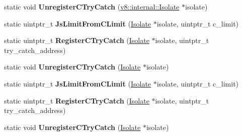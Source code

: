 \begin{DoxyCompactItemize}
\item 
static void {\bfseries Unregister\+C\+Try\+Catch} (\hyperlink{classv8_1_1internal_1_1_isolate}{v8\+::internal\+::\+Isolate} $\ast$isolate)\hypertarget{classv8_1_1internal_1_1_simulator_stack_aba310aee87eed385313d42cbc30dcd8a}{}\label{classv8_1_1internal_1_1_simulator_stack_aba310aee87eed385313d42cbc30dcd8a}

\item 
static uintptr\+\_\+t {\bfseries Js\+Limit\+From\+C\+Limit} (\hyperlink{classv8_1_1internal_1_1_isolate}{Isolate} $\ast$isolate, uintptr\+\_\+t c\+\_\+limit)\hypertarget{classv8_1_1internal_1_1_simulator_stack_a093b55e95fcd0c97eb2c1c262b893a08}{}\label{classv8_1_1internal_1_1_simulator_stack_a093b55e95fcd0c97eb2c1c262b893a08}

\item 
static uintptr\+\_\+t {\bfseries Register\+C\+Try\+Catch} (\hyperlink{classv8_1_1internal_1_1_isolate}{Isolate} $\ast$isolate, uintptr\+\_\+t try\+\_\+catch\+\_\+address)\hypertarget{classv8_1_1internal_1_1_simulator_stack_aa65ef6412ce0b3fd2c27fa870162524b}{}\label{classv8_1_1internal_1_1_simulator_stack_aa65ef6412ce0b3fd2c27fa870162524b}

\item 
static void {\bfseries Unregister\+C\+Try\+Catch} (\hyperlink{classv8_1_1internal_1_1_isolate}{Isolate} $\ast$isolate)\hypertarget{classv8_1_1internal_1_1_simulator_stack_a88b1641de138b2d8eb764f9d71f601c8}{}\label{classv8_1_1internal_1_1_simulator_stack_a88b1641de138b2d8eb764f9d71f601c8}

\item 
static uintptr\+\_\+t {\bfseries Js\+Limit\+From\+C\+Limit} (\hyperlink{classv8_1_1internal_1_1_isolate}{Isolate} $\ast$isolate, uintptr\+\_\+t c\+\_\+limit)\hypertarget{classv8_1_1internal_1_1_simulator_stack_a093b55e95fcd0c97eb2c1c262b893a08}{}\label{classv8_1_1internal_1_1_simulator_stack_a093b55e95fcd0c97eb2c1c262b893a08}

\item 
static uintptr\+\_\+t {\bfseries Register\+C\+Try\+Catch} (\hyperlink{classv8_1_1internal_1_1_isolate}{Isolate} $\ast$isolate, uintptr\+\_\+t try\+\_\+catch\+\_\+address)\hypertarget{classv8_1_1internal_1_1_simulator_stack_aa65ef6412ce0b3fd2c27fa870162524b}{}\label{classv8_1_1internal_1_1_simulator_stack_aa65ef6412ce0b3fd2c27fa870162524b}

\item 
static void {\bfseries Unregister\+C\+Try\+Catch} (\hyperlink{classv8_1_1internal_1_1_isolate}{Isolate} $\ast$isolate)\hypertarget{classv8_1_1internal_1_1_simulator_stack_a88b1641de138b2d8eb764f9d71f601c8}{}\label{classv8_1_1internal_1_1_simulator_stack_a88b1641de138b2d8eb764f9d71f601c8}

\end{DoxyCompactItemize}


